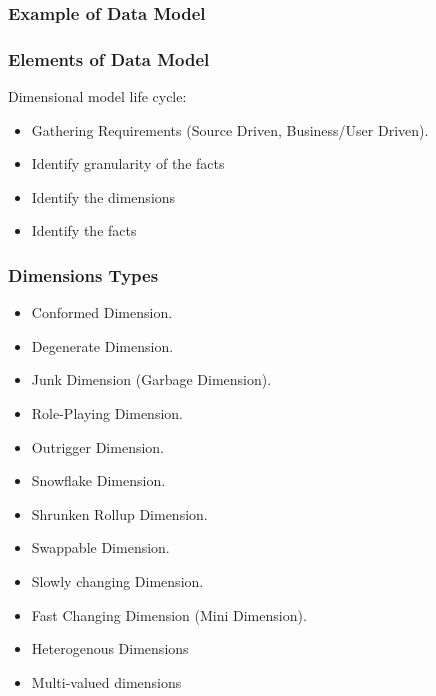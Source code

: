 \begin{frame}
    \frametitle{Example of Data Model}

    
\end{frame}

\begin{frame}
	\frametitle{Elements of Data Model}
		Dimensional model life cycle:
	    \begin{itemize}[<+->]
			\item Gathering Requirements (Source Driven, Business/User Driven).
			\item Identify granularity of the facts
			\item Identify the dimensions
			\item Identify the facts
	    \end{itemize}	
\end{frame}

\begin{frame}
\frametitle{Dimensions Types}
	\begin{itemize}[<+->]
		\item Conformed Dimension.
		\item Degenerate Dimension.
		\item Junk Dimension (Garbage Dimension).
		\item Role-Playing Dimension.
		\item Outrigger Dimension.
		\item Snowflake Dimension.
		\item Shrunken Rollup Dimension.
		\item Swappable Dimension.
		\item Slowly changing Dimension.
		\item Fast Changing Dimension (Mini Dimension).
		\item Heterogenous Dimensions
		\item Multi-valued dimensions
	\end{itemize}
\end{frame}

